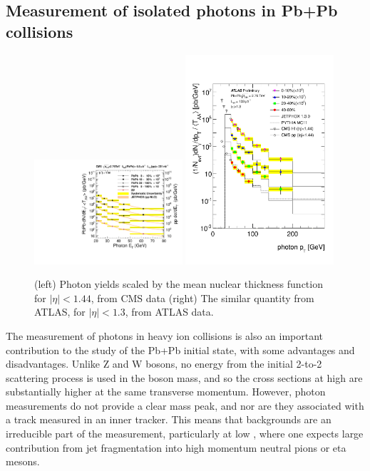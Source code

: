 \subsection{Measurement of isolated photons in Pb+Pb collisions}

\begin{figure}[!htb]
\begin{center}
\includegraphics[width=0.49\textwidth]{electroweak_figs/TAAScaling.pdf}
\includegraphics[width=0.49\textwidth]{electroweak_figs/ph_fig_11.pdf}
\caption[]{(left) Photon yields scaled by the mean nuclear thickness function for $|\eta|<1.44$, from CMS data (right) The similar quantity from ATLAS, for $|\eta|<1.3$, from ATLAS data.}
\label{fig:pas:zw}
\end{center}
\end{figure}

The measurement of photons in heavy ion collisions is also an important contribution to the
study of the Pb+Pb initial state, with some advantages and disadvantages.  Unlike Z and W bosons, 
no energy from the initial 2-to-2 scattering process is used in the boson mass, 
and so the cross sections at high \pT are substantially higher at the same transverse momentum.
However, photon measurements do not provide a clear mass peak, and nor are they associated with
a track measured in an inner tracker.  This means that backgrounds are an irreducible part of
the measurement, particularly at low \pT, where one expects large contribution from jet fragmentation
into high momentum neutral pions or eta mesons.

